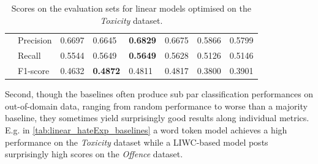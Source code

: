 \begin{table}[]
\begin{minipage}{0.42\paperheight}
{\begin{tabular}{ll|ll|ll|ll}
                                        & Precision & 0.6697 & 0.6645            & \bf{0.6829} & 0.6675      & 0.5866 & 0.5799          \\
                                        & Recall    & 0.5544 & 0.5649            & \bf{0.5649} & 0.5628      & 0.5126 & 0.5146          \\
                                        & F1-score  & 0.4632 & \bf{0.4872}       & 0.4811      & 0.4817      & 0.3800 & 0.3901
    \end{tabular}%
    }
    \caption{Scores on the evaluation sets for linear models optimised on the \textit{Toxicity} dataset.}
    \label{tab:linear_toxicity_baselines}
    \end{minipage}
\end{table}

Second, though the baselines often produce sub par classification performances on out-of-domain data, ranging from random performance to worse than a majority baseline, they sometimes yield surprisingly good results along individual metrics.
E.g. in \cref{tab:linear_hateExp_baselines} a word token model achieves a high performance on the \textit{Toxicity} dataset while a LIWC-based model posts surprisingly high scores on the \textit{Offence} dataset.


